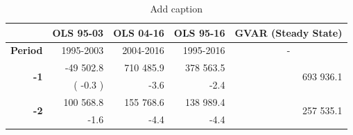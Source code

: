 \begin{table}[htbp]
  \centering
  \caption{Add caption}
    \begin{tabular}{rrrrr}
    \toprule
          & \multicolumn{1}{l}{\textbf{OLS 95-03}} & \multicolumn{1}{l}{\textbf{OLS 04-16}} & \multicolumn{1}{l}{\textbf{OLS 95-16}} & \multicolumn{1}{l}{\textbf{GVAR (Steady State)}} \\
    \midrule
    \multicolumn{1}{l}{\textbf{Period}} & 1995-2003 & 2004-2016 & 1995-2016 & \multicolumn{1}{c}{-} \\
    \midrule
    \multirow{2}[2]{*}{\textbf{-1}} & -49 502.8 & 710 485.9 & 378 563.5 & \multirow{2}[2]{*}{693 936.1} \\
          & ( -0.3 ) & -3.6  & -2.4  &  \\
    \midrule
    \multirow{2}[2]{*}{\textbf{-2}} & 100 568.8 & 155 768.6 & 138 989.4 & \multirow{2}[2]{*}{257 535.1} \\
          & -1.6  & -4.4  & -4.4  &  \\
    \bottomrule
    \end{tabular}%
  \label{tab:addlabel}%
\end{table}%

